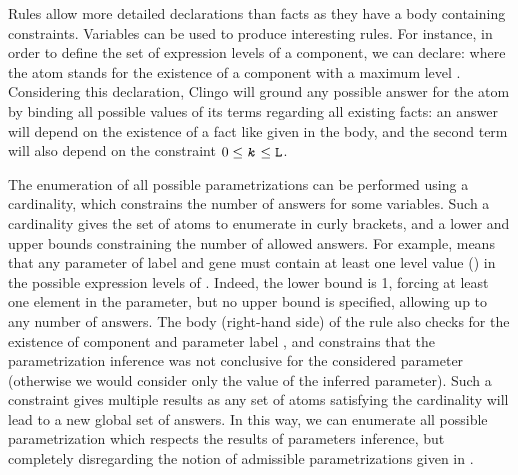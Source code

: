 Rules allow more detailed declarations than facts as they have a body containing constraints. Variables can be used to produce interesting rules.
For instance, in order to define the set of expression levels of a component, we can declare:
where the  atom stands for the existence of a component  with a maximum level .
Considering this declaration, Clingo will ground any possible answer for the atom  by binding all possible values of its terms regarding all existing facts: an answer  will depend on the existence of a fact like given in the body, and the second term will also depend on the constraint $0 \leq \texttt{\textit{k}} \leq \texttt{L}$.

The enumeration of all possible parametrizations can be performed using a cardinality, which constrains the number of answers for some variables.
Such a cardinality gives the set of atoms to enumerate in curly brackets, and a lower and upper bounds constraining the number of allowed answers.
For example,
means that any parameter of label  and gene  must contain at least one level value () in the possible expression levels of .
Indeed, the lower bound is 1, forcing at least one element in the parameter, but no upper bound is specified, allowing up to any number of answers.
The body (right-hand side) of the rule also checks for the existence of component  and parameter label , and constrains that the parametrization inference was not conclusive for the considered parameter (otherwise we would consider only the value of the inferred parameter).
Such a constraint gives multiple results as any set of atoms satisfying the cardinality will lead to a new global set of answers.
In this way, we can enumerate all possible parametrization which respects the results of parameters
inference, but completely disregarding the notion of admissible parametrizations given in
.

